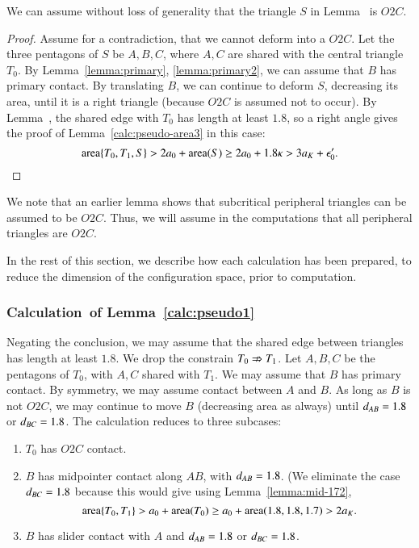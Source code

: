 \begin{lemma}  We can assume without loss of generality that the triangle $S$ in Lemma~
is $O2C$.
\end{lemma}

\begin{proof} Assume for a contradiction, that we cannot deform into a $O2C$.  Let the three pentagons of $S$
be $A,B,C$, where $A,C$ are shared with the central triangle $T_0$.  By Lemma~\ref{lemma:primary}, \ref{lemma:primary2},
we can assume that $B$ has primary contact.  By translating $B$, we can continue to deform $S$, decreasing its area,
until it is a right triangle (because $O2C$ is assumed not to occur).  By Lemma~, the shared edge
with $T_0$ has length at least $1.8$, so a right angle gives the proof of Lemma~\ref{calc:pseudo-area3} in this case:
\[
{\operatorname{area}}\{T_0,T_1,S\} > 2a_0 + {\operatorname{area}}(S) \ge 2a_0 + 1.8\kappa > 3a_K + \epsilon_0'.
\]
\end{proof}


We note that an earlier lemma shows that subcritical peripheral triangles can be assumed to be $O2C$. Thus,
we will assume in the computations that all peripheral triangles are $O2C$.

In the rest of this section, we describe how each  calculation has been prepared, to reduce the dimension
of the configuration space, prior to computation.

\subsubsection{Calculation~of Lemma~\ref{calc:pseudo1}} 
Negating the conclusion, we may assume that the shared edge between triangles has length at least $1.8$.  We drop the constrain $T_0\nRightarrow T_1$.
Let $A,B,C$ be the pentagons of $T_0$, with $A,C$ shared with $T_1$. We may assume that $B$ has primary contact. By symmetry, we may assume
contact between $A$ and $B$.  As long as $B$ is not  $O2C$, we may continue to move $B$ (decreasing area as always) until $d_{AB}=1.8$ or $d_{BC}=1.8$.
The calculation reduces to three subcases:
\begin{enumerate}
\item $T_0$ has $O2C$ contact.
\item $B$ has midpointer contact along $AB$, with $d_{AB}=1.8$.  (We eliminate the case $d_{BC}=1.8$ because this
would give using Lemma~\ref{lemma:mid-172},
\[
{\operatorname{area}}\{T_0,T_1\} > a_0 + {\operatorname{area}}(T_0) \ge a_0 + {\operatorname{area}}(1.8,1.8,1.7) > 2a_K.
\]
\item $B$ has slider contact with $A$ and $d_{AB}=1.8$ or $d_{BC}=1.8$.
\end{enumerate}

